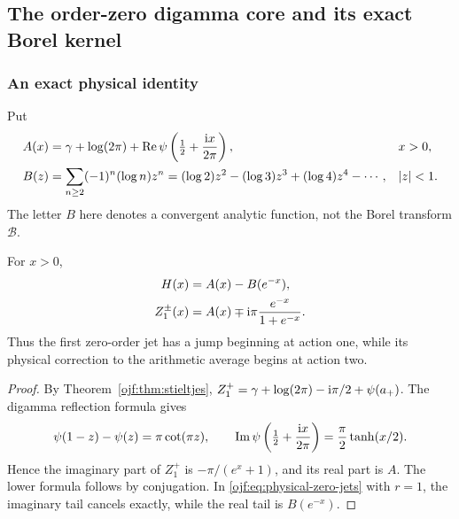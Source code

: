 \subsection{The order-zero digamma core and its exact Borel kernel}
\label{ojf:sec:borelzero}

\subsubsection{An exact physical identity}
Put
\begin{align}
 A(x)&=\gamma+\log(2\pi)+
              \operatorname{Re}\psi\left(\tfrac12+\frac{\mathrm{i} x}{2\pi}\right),
                   &&x>0,\label{ojf:eq:A-real}\\
 B(z)&=\sum_{n\ge2}(-1)^n(\log n)z^n
          =(\log2)z^2-(\log3)z^3+(\log4)z^4-\cdots,
                   &&|z|<1.\label{ojf:eq:B}
\end{align}
The letter $B$ here denotes a convergent analytic function, not the
Borel transform $\mathcal{B}$.

\begin{proposition}
\label{ojf:prop:digamma}
For $x>0$,
\begin{align}
 H(x)&=A(x)-B(e^{-x}),\label{ojf:eq:H-A}\\
 Z_1^\pm(x)&=A(x)\mp\mathrm{i}\pi\frac{e^{-x}}{1+e^{-x}}.
                                                        \label{ojf:eq:Z1}
\end{align}
Thus the first zero-order jet has a jump beginning at action one,
while its physical correction to the arithmetic average begins at
action two.
\end{proposition}
\begin{proof}
By Theorem~\ref{ojf:thm:stieltjes},
$Z_1^+=\gamma+\log(2\pi)-\mathrm{i}\pi/2+\psi(a_+)$.
The digamma reflection formula \cite[\S5.5]{ojf:DLMFGamma} gives
\[
 \psi(1-z)-\psi(z)=\pi\cot(\pi z),\qquad
 \operatorname{Im}\psi\left(\tfrac12+\frac{\mathrm{i} x}{2\pi}\right)
                =\frac\pi2\tanh(x/2).
\]
Hence the imaginary part of $Z_1^+$ is $-\pi/(e^x+1)$, and
its real part is $A$. The lower formula follows by conjugation.
In \eqref{ojf:eq:physical-zero-jets} with $r=1$, the imaginary tail
cancels exactly, while the real tail is $B(e^{-x})$.
\end{proof}

